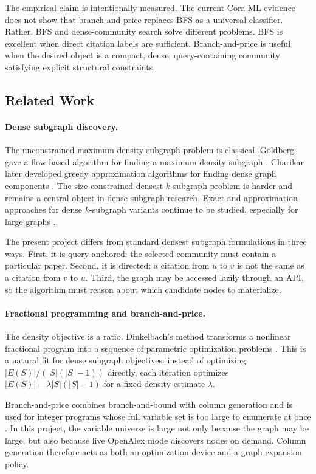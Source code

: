 \documentclass[11pt]{article}
\begin{document}
The empirical claim is intentionally measured. The current Cora-ML evidence does
not show that branch-and-price replaces BFS as a universal classifier. Rather,
BFS and dense-community search solve different problems. BFS is excellent when
direct citation labels are sufficient. Branch-and-price is useful when the
desired object is a compact, dense, query-containing community satisfying
explicit structural constraints.

\subsection{Related Work}

\paragraph{Dense subgraph discovery.}
The unconstrained maximum density subgraph problem is classical. Goldberg gave a
flow-based algorithm for finding a maximum density subgraph
\cite{goldberg1984}. Charikar later developed greedy approximation algorithms
for finding dense graph components \cite{charikar2000}. The size-constrained
densest $k$-subgraph problem is harder and remains a central object in dense
subgraph research. Exact and approximation approaches for dense $k$-subgraph
variants continue to be studied, especially for large graphs
\cite{veremyev2017}.

The present project differs from standard densest subgraph formulations in three
ways. First, it is query anchored: the selected community must contain a
particular paper. Second, it is directed: a citation from $u$ to $v$ is not the
same as a citation from $v$ to $u$. Third, the graph may be accessed lazily
through an API, so the algorithm must reason about which candidate nodes to
materialize.

\paragraph{Fractional programming and branch-and-price.}
The density objective is a ratio. Dinkelbach's method transforms a nonlinear
fractional program into a sequence of parametric optimization problems
\cite{dinkelbach1967}. This is a natural fit for dense subgraph objectives:
instead of optimizing $|E(S)|/(|S|(|S|-1))$ directly, each iteration optimizes
$|E(S)|-\lambda |S|(|S|-1)$ for a fixed density estimate $\lambda$.

Branch-and-price combines branch-and-bound with column generation and is used
for integer programs whose full variable set is too large to enumerate at once
\cite{barnhart1998}. In this project, the variable universe is large not only
because the graph may be large, but also because live OpenAlex mode discovers
nodes on demand. Column generation therefore acts as both an optimization device
and a graph-expansion policy.
\end{document}
